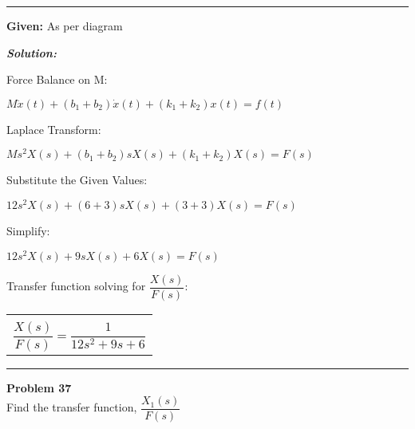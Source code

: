 \documentclass[11pt,letterpaper]{article}
\begin{document}
	\rule{\textwidth}{1pt}

\noindent\textbf{Given:} As per diagram

\vspace{12pt}
\noindent\textit{\textbf{Solution:}}

\vspace{12pt}

Force Balance on M:\\
\begin{center}
	$M\ddot{x}(t)+(b_1+b_2)\dot{x}(t)+(k_1+k_2)x(t)=f(t)$\\
\end{center}
Laplace Transform:\\
\begin{center}
	$Ms^2X(s)+(b_1+b_2)sX(s)+(k_1+k_2)X(s)=F(s)$\\
\end{center}
Substitute the Given Values:\\
\begin{center}
	$12s^2X(s)+(6+3)sX(s)+(3+3)X(s)=F(s)$\\
\end{center}
Simplify:\\
\begin{center}
	$12s^2X(s)+9sX(s)+6X(s)=F(s)$\\
\end{center}
Transfer function solving for $\dfrac{X(s)}{F(s)}:$\\
\begin{center}
	\begin{tabular}{|c|}
		\hline \\
		$\dfrac{X(s)}{F(s)}=\dfrac{1}{12s^2+9s+6}$	\\ [12pt]
	\hline
	\end{tabular}	
\end{center}

\clearpage

\rule{\textwidth}{1pt}
\textbf{Problem 37}\\
Find the transfer function, $\dfrac{X_1(s)}{F(s)}$ \\
\end{document}
